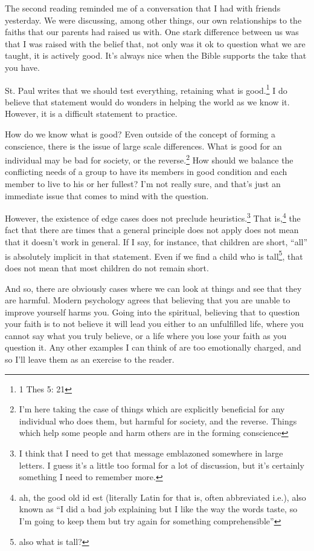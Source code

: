 \documentclass[12pt]{article}[titlepage]
\newcommand{\say}[1]{``#1''}
\newcommand{\1}{\={a}}
\newcommand{\2}{\={e}}
\newcommand{\3}{\={\i}}
\newcommand{\4}{\=o}
\newcommand{\5}{\=u}
\newcommand{\6}{\={A}}
\renewcommand{\,}{\textsuperscript{,}}
\begin{document}
The second reading reminded me of a conversation that I had with friends yesterday.
We were discussing, among other things, our own relationships to the faiths that our parents had raised us with.
One stark difference between us was that I was raised with the belief that, not only was it ok to question what we are taught, it is actively good.
It's always nice when the Bible supports the take that you have.

St. Paul writes that we should test everything, retaining what is good.\footnote{1 Thes 5: 21}
I do believe that statement would do wonders in helping the world as we know it.
However, it is a difficult statement to practice.

How do we know what is good?
Even outside of the concept of forming a conscience, there is the issue of large scale differences.
What is good for an individual may be bad for society, or the reverse.\footnote{I'm here taking the case of things which are explicitly beneficial for any individual who does them, but harmful for society, and the reverse. Things which help some people and harm others are in the forming conscience}
How should we balance the conflicting needs of a group to have its members in good condition and each member to live to his or her fullest?
I'm not really sure, and that's just an immediate issue that comes to mind with the question.

However, the existence of edge cases does not preclude heuristics.\footnote{I think that I need to get that message emblazoned somewhere in large letters.
I guess it's a little too formal for a lot of discussion, but it's certainly something I need to remember more.}
That is,\footnote{ah, the good old id est (literally Latin for that is, often abbreviated i.e.), also known as \say{I did a bad job explaining but I like the way the words taste, so I'm going to keep them but try again for something comprehensible}} the fact that there are times that a general principle does not apply does not mean that it doesn't work in general.
If I say, for instance, that children are short, \say{all} is absolutely implicit in that statement.
Even if we find a child who is tall\footnote{also what is tall?}, that does not mean that most children do not remain short.

And so, there are obviously cases where we can look at things and see that they are harmful.
Modern psychology agrees that believing that you are unable to improve yourself harms you.
Going into the spiritual, believing that to question your faith is to not believe it will lead you either to an unfulfilled life, where you cannot say what you truly believe, or a life where you lose your faith as you question it.
Any other examples I can think of are too emotionally charged, and so I'll leave them as an exercise to the reader.
\end{document}
